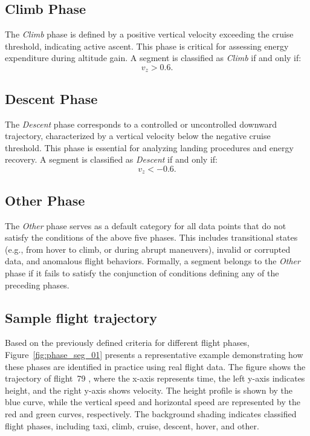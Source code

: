 \subsection{Climb Phase}
The \textit{Climb} phase is defined by a positive vertical velocity exceeding the cruise threshold, indicating active ascent. This phase is critical for assessing energy expenditure during altitude gain. A segment is classified as \textit{Climb} if and only if:
\begin{equation}
v_z > 0.6.    
\end{equation}

\subsection{Descent Phase}
The \textit{Descent} phase corresponds to a controlled or uncontrolled downward trajectory, characterized by a vertical velocity below the negative cruise threshold. This phase is essential for analyzing landing procedures and energy recovery. A segment is classified as \textit{Descent} if and only if:
\begin{equation}
v_z < -0.6.    
\end{equation}

\subsection{Other Phase}
The \textit{Other} phase serves as a default category for all data points that do not satisfy the conditions of the above five phases. This includes transitional states (e.g., from hover to climb, or during abrupt maneuvers), invalid or corrupted data, and anomalous flight behaviors. Formally, a segment belongs to the \textit{Other} phase if it fails to satisfy the conjunction of conditions defining any of the preceding phases.

\subsection{Sample flight trajectory}
Based on the previously defined criteria for different flight phases,  Figure~\ref{fig:phase_seg_01} presents a representative example demonstrating how these phases are identified in practice using real flight data. The figure shows the trajectory of flight~79 , where the x-axis represents time, the left y-axis indicates height, and the right y-axis shows velocity. The height profile is shown by the blue curve, while the vertical speed and horizontal speed are represented by the red and green curves, respectively. The background shading indicates classified flight phases, including taxi, climb, cruise, descent, hover, and other.

